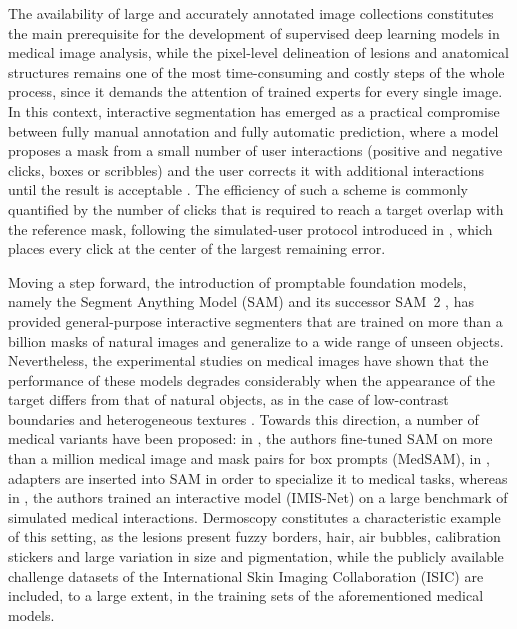 \documentclass[runningheads]{llncs}
\begin{document}
The availability of large and accurately annotated image collections constitutes the main prerequisite for the development of supervised deep learning models in medical image analysis, while the pixel-level delineation of lesions and anatomical structures remains one of the most time-consuming and costly steps of the whole process, since it demands the attention of trained experts for every single image. In this context, interactive segmentation has emerged as a practical compromise between fully manual annotation and fully automatic prediction, where a model proposes a mask from a small number of user interactions (positive and negative clicks, boxes or scribbles) and the user corrects it with additional interactions until the result is acceptable \cite{xu2016dios,sofiiuk2022ritm,liu2023simpleclick}. The efficiency of such a scheme is commonly quantified by the number of clicks that is required to reach a target overlap with the reference mask, following the simulated-user protocol introduced in \cite{xu2016dios}, which places every click at the center of the largest remaining error.

Moving a step forward, the introduction of promptable foundation models, namely the Segment Anything Model (SAM) \cite{kirillov2023sam} and its successor SAM~2 \cite{ravi2025sam2}, has provided general-purpose interactive segmenters that are trained on more than a billion masks of natural images and generalize to a wide range of unseen objects. Nevertheless, the experimental studies on medical images have shown that the performance of these models degrades considerably when the appearance of the target differs from that of natural objects, as in the case of low-contrast boundaries and heterogeneous textures \cite{mazurowski2023samstudy}. Towards this direction, a number of medical variants have been proposed: in \cite{ma2024medsam}, the authors fine-tuned SAM on more than a million medical image and mask pairs for box prompts (MedSAM), in \cite{wu2023medsa}, adapters are inserted into SAM in order to specialize it to medical tasks, whereas in \cite{cheng2025imis}, the authors trained an interactive model (IMIS-Net) on a large benchmark of simulated medical interactions. Dermoscopy constitutes a characteristic example of this setting, as the lesions present fuzzy borders, hair, air bubbles, calibration stickers and large variation in size and pigmentation, while the publicly available challenge datasets of the International Skin Imaging Collaboration (ISIC) \cite{codella2019isic,tschandl2018ham} are included, to a large extent, in the training sets of the aforementioned medical models.
\end{document}
